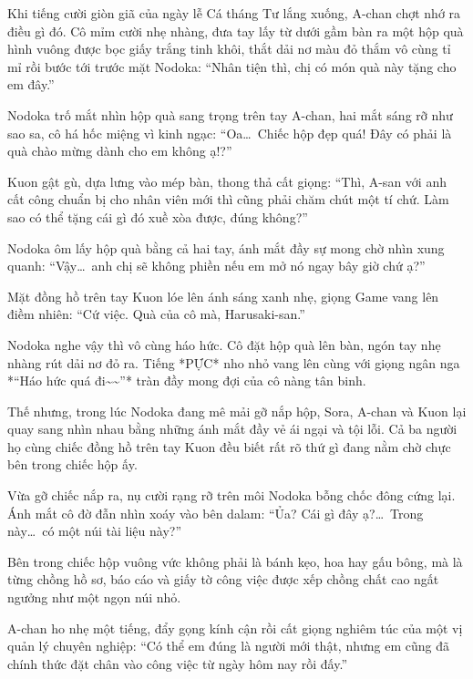\documentclass[../main.tex]{subfiles}
\begin{document}
\omk

Khi tiếng cười giòn giã của ngày lễ Cá tháng Tư lắng xuống, A-chan chợt nhớ ra điều gì đó. Cô mỉm cười nhẹ nhàng, đưa tay lấy từ dưới gầm bàn ra một hộp quà hình vuông được bọc giấy trắng tinh khôi, thắt dải nơ màu đỏ thắm vô cùng tỉ mỉ rồi bước tới trước mặt Nodoka: ``Nhân tiện thì, chị có món quà này tặng cho em đây.''

Nodoka trố mắt nhìn hộp quà sang trọng trên tay A-chan, hai mắt sáng rỡ như sao sa, cô há hốc miệng vì kinh ngạc: ``Oa\dots\ Chiếc hộp đẹp quá! Đây có phải là quà chào mừng dành cho em không ạ!?''

Kuon gật gù, dựa lưng vào mép bàn, thong thả cất giọng: ``Thì, A-san với anh cất công chuẩn bị cho nhân viên mới thì cũng phải chăm chút một tí chứ. Làm sao có thể tặng cái gì đó xuề xòa được, đúng không?''

Nodoka ôm lấy hộp quà bằng cả hai tay, ánh mắt đầy sự mong chờ nhìn xung quanh: ``Vậy\dots\ anh chị sẽ không phiền nếu em mở nó ngay bây giờ chứ ạ?''

Mặt đồng hồ trên tay Kuon lóe lên ánh sáng xanh nhẹ, giọng Game vang lên điềm nhiên: ``Cứ việc. Quà của cô mà, Harusaki-san.''

Nodoka nghe vậy thì vô cùng háo hức. Cô đặt hộp quà lên bàn, ngón tay nhẹ nhàng rút dải nơ đỏ ra. Tiếng *PỰC* nho nhỏ vang lên cùng với giọng ngân nga *“Háo hức quá đi\~{}\~{}”* tràn đầy mong đợi của cô nàng tân binh.

Thế nhưng, trong lúc Nodoka đang mê mải gỡ nắp hộp, Sora, A-chan và Kuon lại quay sang nhìn nhau bằng những ánh mắt đầy vẻ ái ngại và tội lỗi. Cả ba người họ cùng chiếc đồng hồ trên tay Kuon đều biết rất rõ thứ gì đang nằm chờ chực bên trong chiếc hộp ấy.

Vừa gỡ chiếc nắp ra, nụ cười rạng rỡ trên môi Nodoka bỗng chốc đông cứng lại. Ánh mắt cô đờ đẫn nhìn xoáy vào bên dalam: ``Ủa? Cái gì đây ạ?\dots\ Trong này\dots\ có một núi tài liệu này?''

Bên trong chiếc hộp vuông vức không phải là bánh kẹo, hoa hay gấu bông, mà là từng chồng hồ sơ, báo cáo và giấy tờ công việc được xếp chồng chất cao ngất ngưởng như một ngọn núi nhỏ.

A-chan ho nhẹ một tiếng, đẩy gọng kính cận rồi cất giọng nghiêm túc của một vị quản lý chuyên nghiệp: ``Có thể em đúng là người mới thật, nhưng em cũng đã chính thức đặt chân vào công việc từ ngày hôm nay rồi đấy.''
\end{document}
